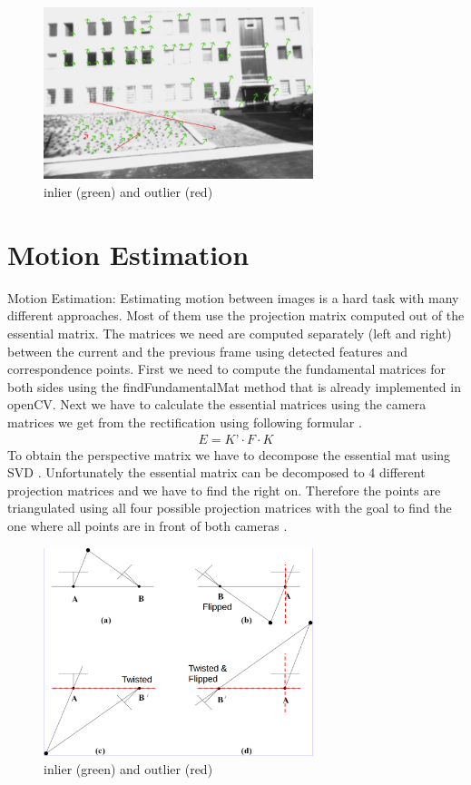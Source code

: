 \documentclass[11pt]{article}
\begin{document}
	\begin{figure}[H]
		\centering
		\includegraphics[width=0.7\textwidth]{images/inlier_outlier3.jpg}
		\caption{inlier (green) and outlier (red)}
	\end{figure}
	

	\section{Motion Estimation}
	
	Motion Estimation:
	Estimating motion between images is a hard task with many different approaches. Most of them use the projection matrix computed out of the essential matrix. The matrices we need are computed separately (left and right) between the current and the previous frame using detected features and correspondence points. First we need to compute the fundamental matrices for both sides using the findFundamentalMat method that is already implemented in openCV. Next we have to calculate the essential matrices using the camera matrices we get from the rectification using following formular \cite{HartleyZisserman}.
	\begin{align}
	  E = K’ \cdot F \cdot K
	\end{align}
	To obtain the perspective matrix we have to decompose the essential mat using SVD \cite{SVD_Essential}. Unfortunately the essential matrix can be decomposed to 4 different projection matrices and we have to find the right on. Therefore the points are triangulated using all four possible projection matrices with the goal to find the one where all points are in front of both cameras \cite{ComputerVision}.
	
	\begin{figure}[H]
		\centering
		\includegraphics[width=0.7\textwidth]{images/possible_P_Mats.png}
		\caption{inlier (green) and outlier (red) \cite{ComputerVision}}
	\end{figure}
\end{document}

